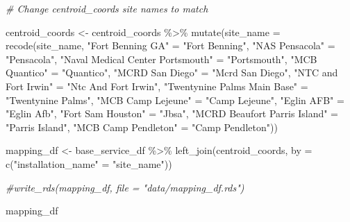 \documentclass[
]{article}
\newenvironment{Shaded}{\begin{snugshade}}{\end{snugshade}}
\newcommand{\AttributeTok}[1]{\textcolor[rgb]{0.77,0.63,0.00}{#1}}
\newcommand{\CommentTok}[1]{\textcolor[rgb]{0.56,0.35,0.01}{\textit{#1}}}
\newcommand{\FunctionTok}[1]{\textcolor[rgb]{0.00,0.00,0.00}{#1}}
\newcommand{\NormalTok}[1]{#1}
\newcommand{\OtherTok}[1]{\textcolor[rgb]{0.56,0.35,0.01}{#1}}
\newcommand{\SpecialCharTok}[1]{\textcolor[rgb]{0.00,0.00,0.00}{#1}}
\newcommand{\StringTok}[1]{\textcolor[rgb]{0.31,0.60,0.02}{#1}}
\begin{document}
\begin{Shaded}
\begin{Highlighting}[]
\CommentTok{\# Change \textasciigrave{}centroid\_coords\textasciigrave{} site names to match}

\NormalTok{centroid\_coords }\OtherTok{\textless{}{-}}
\NormalTok{  centroid\_coords }\SpecialCharTok{\%\textgreater{}\%} 
    \FunctionTok{mutate}\NormalTok{(}\AttributeTok{site\_name =} \FunctionTok{recode}\NormalTok{(site\_name,}
                              \StringTok{"Fort Benning GA"} \OtherTok{=} \StringTok{"Fort Benning"}\NormalTok{,}
                              \StringTok{"NAS Pensacola"} \OtherTok{=} \StringTok{"Pensacola"}\NormalTok{,}
                              \StringTok{"Naval Medical Center Portsmouth"} \OtherTok{=} \StringTok{"Portsmouth"}\NormalTok{,}
                              \StringTok{"MCB Quantico"} \OtherTok{=} \StringTok{"Quantico"}\NormalTok{,}
                              \StringTok{"MCRD San Diego"} \OtherTok{=} \StringTok{"Mcrd San Diego"}\NormalTok{,}
                              \StringTok{"NTC and Fort Irwin"} \OtherTok{=} \StringTok{"Ntc And Fort Irwin"}\NormalTok{,}
                              \StringTok{"Twentynine Palms Main Base"} \OtherTok{=} \StringTok{"Twentynine Palms"}\NormalTok{,}
                              \StringTok{"MCB Camp Lejeune"} \OtherTok{=} \StringTok{"Camp Lejeune"}\NormalTok{,}
                              \StringTok{"Eglin AFB"} \OtherTok{=} \StringTok{"Eglin Afb"}\NormalTok{,}
                              \StringTok{"Fort Sam Houston"} \OtherTok{=} \StringTok{"Jbsa"}\NormalTok{,}
                              \StringTok{"MCRD Beaufort Parris Island"} \OtherTok{=} \StringTok{"Parris Island"}\NormalTok{,}
                              \StringTok{"MCB Camp Pendleton"} \OtherTok{=} \StringTok{"Camp Pendleton"}\NormalTok{))}


\NormalTok{mapping\_df }\OtherTok{\textless{}{-}}
\NormalTok{  base\_service\_df }\SpecialCharTok{\%\textgreater{}\%} 
    \FunctionTok{left\_join}\NormalTok{(centroid\_coords, }\AttributeTok{by =} \FunctionTok{c}\NormalTok{(}\StringTok{"installation\_name"} \OtherTok{=} \StringTok{"site\_name"}\NormalTok{))}

\CommentTok{\#write\_rds(mapping\_df, file = "data/mapping\_df.rds")}
                              


\NormalTok{mapping\_df                              }
\end{Highlighting}
\end{Shaded}
\end{document}
